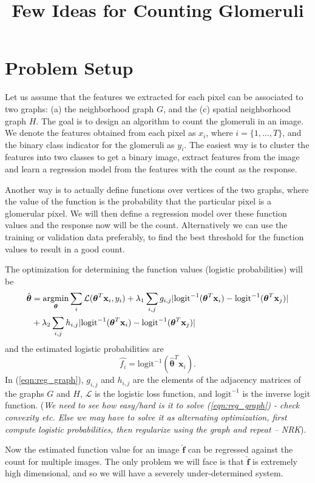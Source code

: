 \documentclass{article}
\newcommand{\argmin}{\operatornamewithlimits{argmin}}
\begin{document}
\title{Few Ideas for Counting Glomeruli}
\date{}
\maketitle


\section{Problem Setup}
\label{sec:prob}
Let us assume that the features we extracted for each pixel can be associated to two graphs: (a) the neighborhood graph $G$,  and the (c) spatial neighborhood graph $H$. The goal is to design an algorithm to count the glomeruli in an image. We denote the features obtained from each pixel as $x_i$, where $i = \{1, \ldots, T\}$, and the binary class indicator for the glomeruli as $y_i$. The easiest way is to cluster the features into two classes to get a binary image, extract features from the image and learn a regression model from the features with the count as the response.

Another way is to actually define functions over vertices of the two graphs, where the value of the function is the probability that the particular pixel is a glomerular pixel. We will then define a regression model over these function values and the response now will be the count. Alternatively we can use the training or validation data preferably, to find the best threshold for the function values to result in a good count.

The optimization for determining the function values (logistic probabilities) will be
\begin{eqnarray}
\nonumber \hat{\boldsymbol{\theta}} &= \argmin_{\boldsymbol{\theta}} \sum_{i} \mathcal{L}(\boldsymbol{\theta}^T \mathbf{x}_i,y_i)+\lambda_1 \sum_{i,j} g_{i,j} |\text{logit}^{-1}(\boldsymbol{\theta}^T \mathbf{x}_i)-\text{logit}^{-1}(\boldsymbol{\theta}^T \mathbf{x}_j)|\\
&+\lambda_2 \sum_{i,j} h_{i,j} |\text{logit}^{-1}(\boldsymbol{\theta}^T \mathbf{x}_i)-\text{logit}^{-1}(\boldsymbol{\theta}^T \mathbf{x}_j)|
\label{eqn:reg_graph}
\end{eqnarray} and the estimated logistic probabilities are
\begin{equation}
\hat{f_i} = \text{logit}^{-1}(\hat{\boldsymbol{\theta}}^T \mathbf{x}_i).
\label{eqn:log_prob}
\end{equation} In (\ref{eqn:reg_graph}), $g_{i,j}$ and $h_{i,j}$ are the elements of the adjacency matrices of the graphs $G$ and $H$, $\mathcal{L}$ is the logistic loss function, and $\text{logit}^{-1}$ is the inverse logit function. (\textit{We need to see how easy/hard is it to solve (\ref{eqn:reg_graph}) - check convexity etc. Else we may have to solve it as alternating optimization, first compute logistic probabilities, then regularize using the graph and repeat -- NRK}).

Now the estimated function value for an image $\hat{\mathbf{f}}$ can be regressed against the count for multiple images. The only problem we will face is that $\hat{\mathbf{f}}$ is extremely high dimensional, and so we will have a severely under-determined system.

%
%
\end{document}
